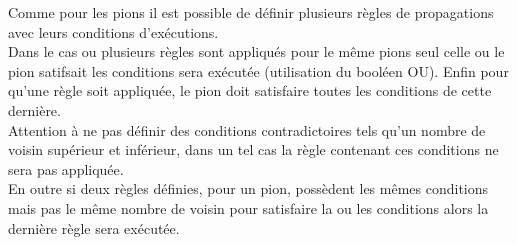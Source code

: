 \documentclass[pdftex,12pt,a4paper]{article}
\begin{document}
Comme pour les pions il est possible de définir plusieurs règles de propagations avec leurs conditions d'exécutions.\\ 
Dans le cas ou plusieurs règles sont appliqués pour le même pions seul celle ou le pion satifsait les conditions sera exécutée (utilisation du booléen OU). Enfin pour qu'une règle soit appliquée, le pion doit satisfaire toutes les conditions de cette dernière.\\ 

Attention à ne pas définir des conditions contradictoires tels qu'un nombre de voisin supérieur et inférieur, dans un tel cas la règle contenant ces conditions ne sera pas appliquée. \\ 

En outre si deux règles définies, pour un pion, possèdent les mêmes conditions mais pas le même nombre de voisin pour satisfaire la ou les conditions alors la dernière règle sera exécutée.
\newpage


\tableofcontents

 
    
     
\end{document}
